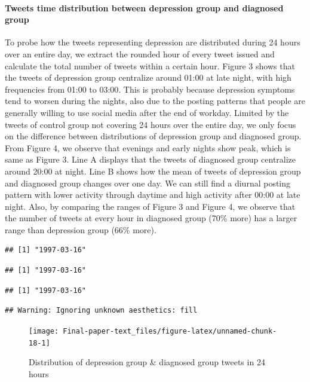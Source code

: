 \documentclass[]{article}
\let\oldparagraph\paragraph
\renewcommand{\paragraph}[1]{\oldparagraph{#1}\mbox{}}
\begin{document}
\hypertarget{tweets-time-distribution-between-depression-group-and-diagnosed-group}{%
\paragraph{Tweets time distribution between depression group and
diagnosed
group}\label{tweets-time-distribution-between-depression-group-and-diagnosed-group}}

To probe how the tweets representing depression are distributed during
24 hours over an entire day, we extract the rounded hour of every tweet
issued and calculate the total number of tweets within a certain hour.
Figure 3 shows that the tweets of depression group centralize around
01:00 at late night, with high frequencies from 01:00 to 03:00. This is
probably because depression symptoms tend to worsen during the nights,
also due to the posting patterns that people are generally willing to
use social media after the end of workday. Limited by the tweets of
control group not covering 24 hours over the entire day, we only focus
on the difference between distributions of depression group and
diagnosed group. From Figure 4, we observe that evenings and early
nights show peak, which is same as Figure 3. Line A displays that the
tweets of diagnosed group centralize around 20:00 at night. Line B shows
how the mean of tweets of depression group and diagnosed group changes
over one day. We can still find a diurnal posting pattern with lower
activity through daytime and high activity after 00:00 at late night.
Also, by comparing the ranges of Figure 3 and Figure 4, we observe that
the number of tweets at every hour in diagnosed group (70\% more) has a
larger range than depression group (66\% more).

\begin{verbatim}
## [1] "1997-03-16"
\end{verbatim}

\begin{verbatim}
## [1] "1997-03-16"
\end{verbatim}

\begin{verbatim}
## [1] "1997-03-16"
\end{verbatim}

\begin{verbatim}
## Warning: Ignoring unknown aesthetics: fill
\end{verbatim}

\begin{figure}

{\centering \texttt{[image: Final-paper-text\_files/figure-latex/unnamed-chunk-18-1]} 

}

\caption{Distribution of depression group & diagnosed group tweets in 24 hours}\label{fig:unnamed-chunk-18}
\end{figure}
\end{document}
